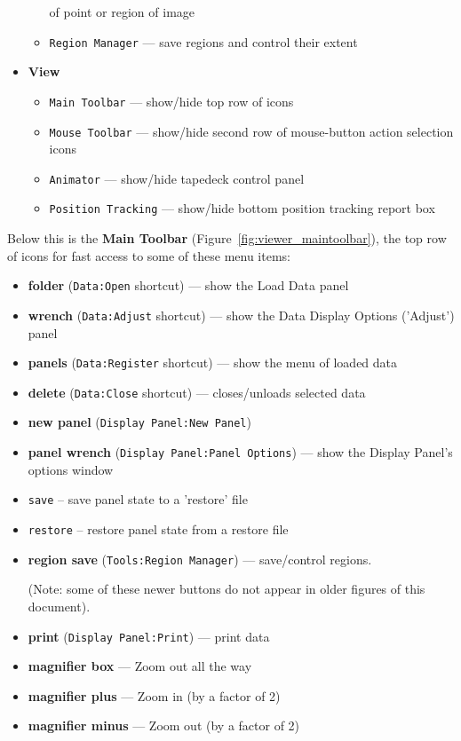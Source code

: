\begin{itemize}
\begin{itemize}
                 of point or region of image
      \item {\tt Region Manager} --- save regions and control their extent 
  \end{itemize}
\item {\bf View}
  \begin{itemize}
      \item {\tt Main Toolbar} --- show/hide top row of icons
      \item {\tt Mouse Toolbar} --- show/hide second row of
                 mouse-button action selection icons
      \item {\tt Animator} --- show/hide tapedeck control panel
      \item {\tt Position Tracking} --- show/hide bottom position
                 tracking report box  
  \end{itemize}
\end{itemize}

Below this is the {\bf Main Toolbar} (Figure~\ref{fig:viewer_maintoolbar}),
the top row of icons for fast access to some of these menu items:
\begin{itemize}
   \item {\bf folder} ({\tt Data:Open} shortcut) --- show the Load Data panel
   \item {\bf wrench} ({\tt Data:Adjust} shortcut) --- show the Data Display
              Options ('Adjust') panel 
   \item {\bf panels} ({\tt Data:Register} shortcut) --- show the 
              menu of loaded data
   \item {\bf delete} ({\tt Data:Close} shortcut) --- closes/unloads 
              selected data
   \item {\bf new panel} ({\tt Display Panel:New Panel})
   \item {\bf panel wrench} ({\tt Display Panel:Panel Options}) --- show
              the Display Panel's options window 
   
   \item  {\tt save} -- save panel state to a 'restore' file
   \item  {\tt restore} -- restore panel state from a restore file
   \item {\bf region save} ({\tt Tools:Region Manager}) --- save/control
    regions.
    
    (Note: some of these newer buttons do not appear in older figures of
    this document).
   
   \item {\bf print} ({\tt Display Panel:Print}) --- print data
   \item {\bf magnifier box} --- Zoom out all the way
   \item {\bf magnifier plus} --- Zoom in (by a factor of 2)
   \item {\bf magnifier minus} --- Zoom out (by a factor of 2)
\end{itemize}

